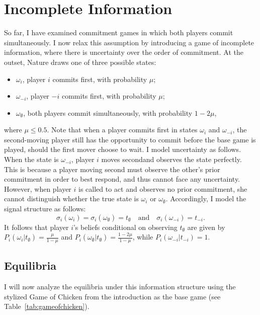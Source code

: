 \documentclass[main.tex]{subfiles}
\begin{document}
\section{Incomplete Information}\label{sec:incomplete_info}
So far, I have examined commitment games in which both players commit simultaneously. I now relax this assumption by introducing a game of incomplete information, where there is uncertainty over the order of commitment. 
At the outset, Nature draws one of three possible states:
\begin{itemize}
    \item $\omega_i$, player $i$ commits first, with probability $\mu$;
    \item $\omega_{-i}$, player $-i$ commits first, with probability $\mu$;
    \item $\omega_\emptyset$, both players commit simultaneously, with probability $1-2\mu$,
\end{itemize}
where $\mu \leq 0.5$. Note that when a player commits first in states $\omega_i$ and $\omega_{-i}$, the second-moving player still has the opportunity to commit before the base game is played, should the first mover choose to wait.
I model uncertainty as follows. When the state is $\omega_{-i}$, player $i$ moves secondand observes the state perfectly. This is because a player moving second must observe the other's prior commitment in order to best respond, and thus cannot face any uncertainty.
However, when player $i$ is called to act and observes no prior commitment, she cannot distinguish whether the true state is $\omega_i$ or $\omega_\emptyset$. 
Accordingly, I model the signal structure as follows: 
\[
\sigma_i(\omega_i)=\sigma_i(\omega_\emptyset)=t_\emptyset \quad\text{and}\quad \sigma_i(\omega_{-i})=t_{-i}.
\]
It follows that player $i$'s beliefs conditional on observing $t_\emptyset$ are given by $P_i(\omega_i|t_\emptyset)=\frac{\mu}{1-\mu}$ and $P_i(\omega_\emptyset|t_\emptyset)=\frac{1-2\mu }{1-\mu}$, while $P_i(\omega_{-i}|t_{-i})=1$. 
\subsection*{\centering  Equilibria}
I will now analyze the equilibria under this information structure using the stylized Game of Chicken from the introduction as the base game (see Table~\ref{tab:gameofchicken}).
 
\end{document}
